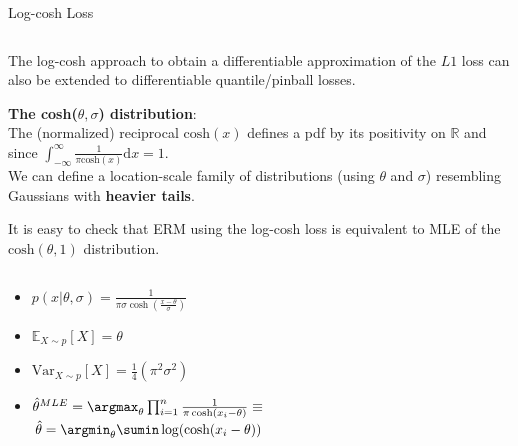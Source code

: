 \documentclass[11pt,compress,t,notes=noshow, xcolor=table]{beamer}
\begin{document}
\begin{vbframe}{Log-cosh Loss }
\begin{columns}
\end{columns}

The log-cosh approach to obtain a differentiable approximation of the $L1$ loss can also be extended to  differentiable quantile/pinball losses.

\framebreak

\textbf{The cosh($\theta,\sigma$) distribution}:\\
The (normalized) reciprocal $\text{cosh}(x)$ defines a pdf by its positivity on $\mathbb{R}$ and since $\int_{-\infty}^{\infty} \frac{1}{\pi \text{cosh}(x)} \text{d}x = 1$.\\
\vspace{0.1cm}
We can define a location-scale family of distributions (using $\theta$ and $\sigma$) resembling Gaussians with \textbf{heavier tails}. 

It is easy to check that ERM using the log-cosh loss is equivalent to MLE of the $\text{cosh}(\theta,1)$ distribution.

\begin{columns}

\begin{column}{0.5\textwidth}

{\normalsize 
\begin{itemize}\setlength{\itemsep}{0.32em}
    \item $p(x | \theta, \sigma)=\frac{1}{\pi \sigma \cosh \left(\frac{x-\theta}{\sigma}\right)}$
    \item $\mathbb{E}_{X\sim p}[X]=\theta$
    \item $\text{Var}_{X \sim p}[X]=\frac{1}{4}(\pi^2 \sigma^2)$
    \item {\footnotesize $\thetah^{MLE}=\argmax_{\theta} \prod_{i=1}^n \frac{1}{\pi \cosh \left(x_i-\theta\right)} \equiv$}\\{\footnotesize $\thetah = \argmin_{\theta}\sumin \log(\text{cosh}(x_i-\theta))$}
\end{itemize}
}
\end{column}

\begin{column}{0.7\textwidth}

\begin{figure}
      \centering
    \end{figure}


\end{column}
\end{columns}
\end{vbframe}
\end{document}
